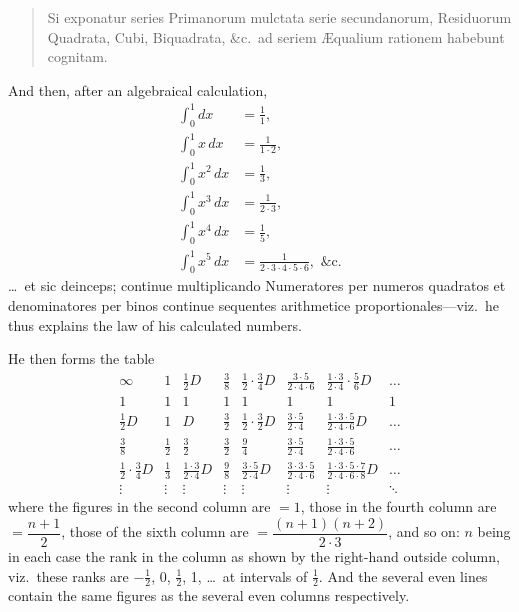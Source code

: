 \documentclass[11pt,a4paper]{book}
\begin{document}
\begin{quote}
Si exponatur series Primanorum mulctata serie secundanorum, Residuorum Quadrata, Cubi, Biquadrata, \&c.\ ad seriem \AE qualium rationem habebunt cognitam.
\end{quote}

And then, after an algebraical calculation,
\begin{align*}
\int_0^1 dx &= \frac{1}{1}, \\
\int_0^1 x\,dx &= \frac{1}{1 \cdot 2}, \\
\int_0^1 x^2\,dx &= \frac{1}{3}, \\
\int_0^1 x^3\,dx &= \frac{1}{2 \cdot 3}, \\
\int_0^1 x^4\,dx &= \frac{1}{5}, \\
\int_0^1 x^5\,dx &= \frac{1}{2 \cdot 3 \cdot 4 \cdot 5 \cdot 6}, \text{ \&c.}
\end{align*}
\ldots\ et sic deinceps; continue multiplicando Numeratores per numeros quadratos et denominatores per binos continue sequentes arithmetice proportionales---viz.\ he thus explains the law of his calculated numbers.

He then forms the table
\[
\begin{array}{cccccccc}
\infty & 1 & \tfrac{1}{2}D & \tfrac{3}{8} & \tfrac{1}{2} \cdot \tfrac{3}{4}D & \tfrac{3 \cdot 5}{2 \cdot 4 \cdot 6} & \tfrac{1 \cdot 3}{2 \cdot 4} \cdot \tfrac{5}{6}D & \ldots \\
1 & 1 & 1 & 1 & 1 & 1 & 1 & 1 \\
\tfrac{1}{2}D & 1 & D & \tfrac{3}{2} & \tfrac{1}{2} \cdot \tfrac{3}{2}D & \tfrac{3 \cdot 5}{2 \cdot 4} & \tfrac{1 \cdot 3 \cdot 5}{2 \cdot 4 \cdot 6}D & \ldots \\
\tfrac{3}{8} & \tfrac{1}{2} & \tfrac{3}{2} & \tfrac{3}{2} & \tfrac{9}{4} & \tfrac{3 \cdot 5}{2 \cdot 4} & \tfrac{1 \cdot 3 \cdot 5}{2 \cdot 4 \cdot 6} & \ldots \\
\tfrac{1}{2} \cdot \tfrac{3}{4}D & \tfrac{1}{3} & \tfrac{1 \cdot 3}{2 \cdot 4}D & \tfrac{9}{8} & \tfrac{3 \cdot 5}{2 \cdot 4}D & \tfrac{3 \cdot 3 \cdot 5}{2 \cdot 4 \cdot 6} & \tfrac{1 \cdot 3 \cdot 5 \cdot 7}{2 \cdot 4 \cdot 6 \cdot 8}D & \ldots \\
\vdots & \vdots & \vdots & \vdots & \vdots & \vdots & \vdots & \ddots
\end{array}
\]
where the figures in the second column are $=1$, those in the fourth column are $= \dfrac{n+1}{2}$, those of the sixth column are $= \dfrac{(n+1)(n+2)}{2 \cdot 3}$, and so on: $n$ being in each case the rank in the column as shown by the right-hand outside column, viz.\ these ranks are $-\tfrac{1}{2}$, 0, $\tfrac{1}{2}$, 1, \ldots\ at intervals of $\tfrac{1}{2}$. And the several even lines contain the same figures as the several even columns respectively.
\end{document}
